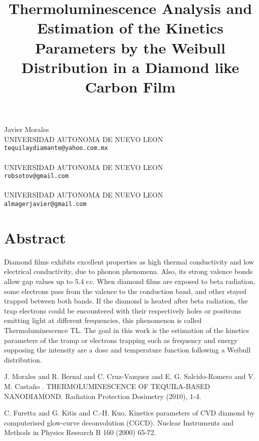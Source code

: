 \title{Thermoluminescence Analysis and Estimation of the Kinetics Parameters by the Weibull Distribution in a Diamond like Carbon Film}
 \author{} \institute{}
\maketitle
\begin{center}
{\large Javier Morales}\\
UNIVERSIDAD AUTONOMA DE NUEVO LEON\\
{\tt tequilaydiamante@yahoo.com.mx}
\\ \vspace{4mm}{\large Roberto Soto}\\
UNIVERSIDAD AUTONOMA DE NUEVO LEON\\
{\tt robsotov@gmail.com}
\\ \\
UNIVERSIDAD AUTONOMA DE NUEVO LEON\\
{\tt almagerjavier@gmail.com}

\end{center}

\section*{Abstract}


Diamond films exhibits excellent properties as high thermal conductivity and low electrical conductivity, due to phonon phenomena.  Also, its strong valence bonds allow gap values up to $5.4 \;ev$. When diamond films are exposed to beta radiation, some electrons pass from the valence to the conduction band, and other stayed trapped between both bands. If the diamond is heated after beta radiation, the trap electrons could be encountered with their respectively holes or positrons emitting light at different frequencies, this phenomenon is called Thermoluminescence TL.   
 The goal in this work is the estimation of the kinetics parameters of the tramp or electrons trapping such as frequency and energy supposing the intensity are a dose and temperature function following a Weibull distribution.


\begin{thebibliography}{10}

{\sc J. Morales and R. Bernal and C. Cruz-Vazquez and E. G. Salcido-Romero and V. M. Casta\~no }. {THERMOLUMINESCENCE OF TEQUILA-BASED NANODIAMOND}. Radiation Protection Dosimetry (2010), 1-4.



{\sc C. Furetta and G. Kitis and C.-H. Kuo}. {Kinetics parameters of CVD diamond by computerised glow-curve deconvolution (CGCD)}. Nuclear Instruments and Methods in Physics Research B 160 (2000) 65-72.

\end{thebibliography}
